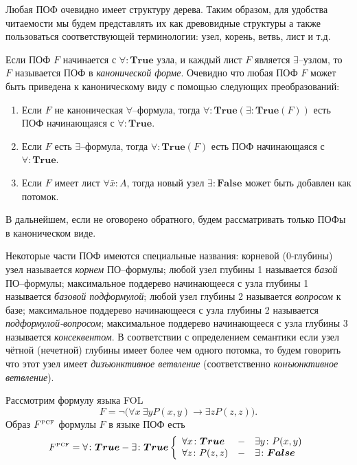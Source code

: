 Любая ПОФ очевидно имеет структуру дерева. Таким образом, для удобства читаемости мы будем представлять их как древовидные структуры а также пользоваться соответствующей терминологии: узел, корень, ветвь, лист и т.д.

Если ПОФ $F$ начинается с $\forall\colon\boldsymbol{True}$ узла, и каждый лист $F$ является $\exists$--узлом, то $F$ называется ПОФ в {\em канонической форме}.
Очевидно что любая ПОФ $F$ может быть приведена к каноническому виду с помощью следующих преобразований:
\begin{enumerate}
\item Если $F$ не каноническая $\forall$--формула, тогда $\forall\colon \boldsymbol{True}\left(\exists\colon \boldsymbol{True}\left(F\right)\right)$ есть ПОФ начинающаяся с $\forall\colon\boldsymbol{True}$.
\item Если $F$ есть $\exists$--формула, тогда $\forall\colon \boldsymbol{True}\left(F\right)$ есть ПОФ начинающаяся с $\forall\colon\boldsymbol{True}$.
\item Если $F$ имеет лист $\forall \bar{x}\colon A$, тогда новый узел $\exists\colon\boldsymbol{False}$ может быть добавлен как потомок.
\end{enumerate}

В дальнейшем, если не оговорено обратного, будем рассматривать только ПОФы в каноническом виде.

Некоторые части ПОФ имеются специальные названия: корневой (0-глубины) узел называется {\em корнем} ПО--формулы; любой узел глубины 1 называется {\em базой} ПО--формулы; максимальное поддерево начинающееся с узла глубины 1 называется {\em базовой подформулой}; любой узел глубины 2 называется {\em вопросом} к базе; максимальное поддерево начинающееся с узла глубины 2 называется {\em подформулой-вопросом}; максимальное поддерево начинающееся с узла глубины 3 называется {\em консеквентом}. В соответствии с определением семантики если узел чётной (нечетной) глубины имеет более чем одного потомка, то будем говорить что этот узел имеет {\em дизъюнктивное ветвление} (соответственно {\em конъюнктивное ветвление}).

\begin{example}
Рассмотрим формулу языка FOL
$$F= \neg\bigl(\forall x\:\exists y P(x,y)\rightarrow \exists z P(z,z)\bigr).$$
Образ $F^{\text{\tiny{PCF}}}$ формулы $F$ в языке ПОФ есть
$$F^{\text{\tiny{PCF}}} = \forall\colon \boldsymbol{True}-\exists\colon\boldsymbol{True} \left\{
\begin{array}{lcl}
 \forall x\colon\boldsymbol{True} & - & \exists y\colon P(x,y) \\
 \forall z\colon P(z,z) & - & \exists\colon\boldsymbol{False}
\end{array}
\right.$$

\end{example}


